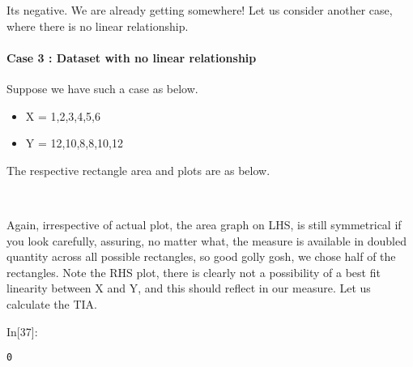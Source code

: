 \documentclass[float=false,crop=false]{standalone}
\begin{document}
    Its negative. We are already getting somewhere! Let us consider another
case, where there is no linear relationship.

\paragraph{Case 3 : Dataset with no linear
relationship}\label{case-3-dataset-with-no-linear-relationship}

Suppose we have such a case as below.

\begin{itemize}
\tightlist
\item
  X = 1,2,3,4,5,6\\
\item
  Y = 12,10,8,8,10,12
\end{itemize}

The respective rectangle area and plots are as below.
    \begin{center}
    \end{center}
    { \hspace*{\fill} \\}
    
    Again, irrespective of actual plot, the area graph on LHS, is still
symmetrical if you look carefully, assuring, no matter what, the measure
is available in doubled quantity across all possible rectangles, so good
golly gosh, we chose half of the rectangles. Note the RHS plot, there is
clearly not a possibility of a best fit linearity between X and Y, and
this should reflect in our measure. Let us calculate the TIA.
\begin{InVerbatim}[commandchars=\\\{\},fontsize=\scriptsize]
{\color{incolor}In[{\color{incolor}37}]:}     \PY{p}{[}\PY{p}{]}\PY{p}{[}\PY{p}{]}
\end{InVerbatim}
    \begin{Verbatim}[commandchars=\\\{\},fontsize=\footnotesize]
0

    \end{Verbatim}
\end{document}

